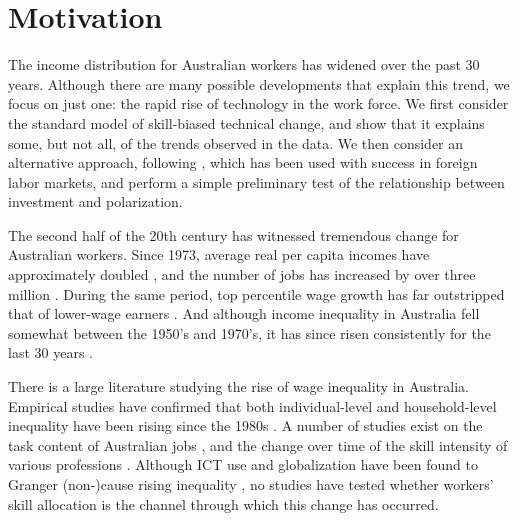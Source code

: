         


\section{Motivation}
The income distribution for Australian workers has widened over the past 30 years. Although there are many possible developments that explain this trend, we focus on just one: the rapid rise of technology in the work force. We first consider the standard model of skill-biased technical change, and show that it explains some, but not all, of the trends observed in the data. We then consider an alternative approach, following \citet{Levy2003}, which has been used with success in foreign labor markets, and perform a simple preliminary test of the relationship between investment and polarization.

The second half of the 20th century has witnessed tremendous change for Australian workers. Since 1973, average real per capita incomes have approximately doubled \citep{NA20124}, and the number of jobs has increased by over three million \citep{LFSApr2013}. During the same period, top percentile wage growth has far outstripped that of lower-wage earners \citep{Atkinson1997,Borland1999}. And although income inequality in Australia fell somewhat between the 1950's and 1970's, it has since risen consistently for the last 30 years \citep{Leigh2005,Gaston2009}.

There is a large literature studying the rise of wage inequality in Australia. Empirical studies have confirmed that both individual-level and household-level inequality have been rising since the 1980s \citep{Borland1999,Leigh2005,Gaston2009}. A number of studies exist on the task content of Australian jobs \citep{Esposto2012a}, and the change over time of the skill intensity of various professions \citep{Esposto2012, Esposto2012a}. Although ICT use and globalization have been found to Granger (non-)cause rising inequality \citep{Gaston2009}, no studies have tested whether workers' skill allocation is the channel through which this change has occurred.

